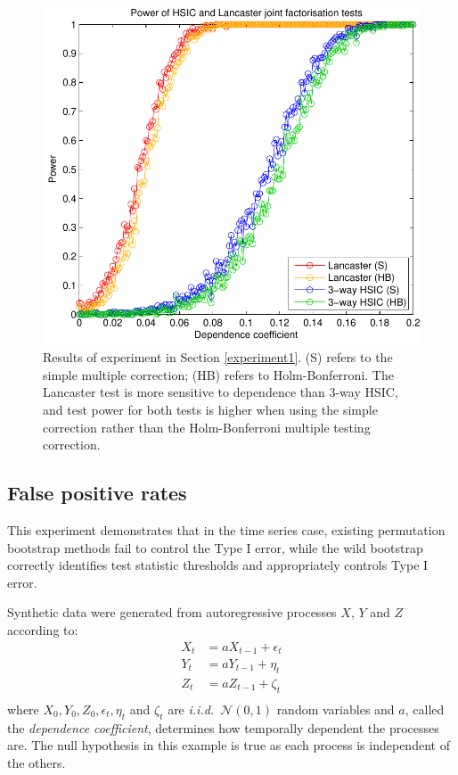 \documentclass[]{article}
\begin{document}
\begin{figure}[ht]
\vskip 0.2in
\begin{center}
\centerline{\includegraphics[scale=0.6]{UAI_Figure1.pdf}}
\caption{Results of experiment in Section \ref{experiment1}. (S) refers to the simple multiple correction; (HB) refers to Holm-Bonferroni. The Lancaster test is more sensitive to dependence than 3-way HSIC, and test power for both tests is higher when using the simple correction rather than the Holm-Bonferroni multiple testing correction.}
\label{weak-pairwise-strong-joint}
\end{center}
\vskip -0.2in
\end{figure} 

\subsection{False positive rates}\label{experiment2}

This experiment demonstrates that in the time series case, existing permutation bootstrap methods fail to control the Type I error, while the  wild bootstrap correctly identifies test statistic thresholds and appropriately controls Type I error.

Synthetic data were generated from autoregressive processes $X$, $Y$ and $Z$ according to:
\begin{align*}
X_t &= aX_{t-1} + \epsilon_t\\
Y_t &= aY_{t-1} + \eta_t\\
Z_t &= aZ_{t-1} +  \zeta_t\\
\end{align*}
where $X_0, Y_0, Z_0, \epsilon_t, \eta_t$ and $\zeta_t$ are \emph{i.i.d.}~$\mathcal{N}(0,1)$ random variables and $a$, called the \emph{dependence coefficient}, determines how temporally dependent the processes are. The null hypothesis in this example is true as each process is independent of the others.
\end{document}
